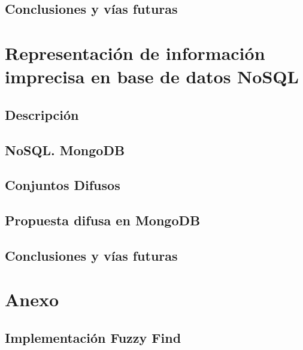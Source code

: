 \documentclass[ oneside,openany,titlepage,numbers=noenddot,headinclude,%
                footinclude=true,cleardoublepage=empty,abstractoff, %
                BCOR=5mm,paper=a4,fontsize=11pt,%
                spanish,american%
                ]{scrreprt}
\begin{document}
\chapter{Conclusiones y vías futuras}


\part{Representación de información imprecisa en base de datos NoSQL}

\chapter{Descripción}




\chapter{NoSQL. MongoDB}


\chapter{Conjuntos Difusos}


\chapter{Propuesta difusa en MongoDB}


\chapter{Conclusiones y vías futuras}


\appendix
\part*{Anexo}
\chapter{Implementación Fuzzy Find}


\cleardoublepage
\cleardoublepage
\cleardoublepage
\end{document}
